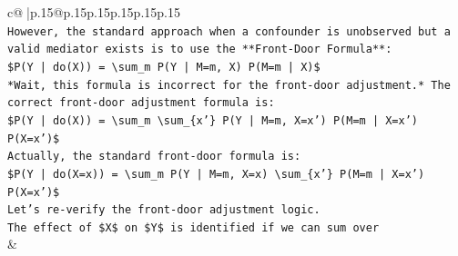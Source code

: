\documentclass{article}
\begin{document}
{\begin{supertabular}{c@{$\;$}|p{.15\linewidth}@{}p{.15\linewidth}p{.15\linewidth}p{.15\linewidth}p{.15\linewidth}p{.15\linewidth}}
{{{\\ 
\texttt{However, the standard approach when a confounder is unobserved but a valid mediator exists is to use the **Front{-}Door Formula**:} \\
\texttt{\$P(Y | do(X)) = \textbackslash{}sum\_m P(Y | M=m, X) P(M=m | X)\$} \\
\texttt{*Wait, this formula is incorrect for the front{-}door adjustment.* The correct front{-}door adjustment formula is:} \\
\texttt{\$P(Y | do(X)) = \textbackslash{}sum\_m \textbackslash{}sum\_\{x'\} P(Y | M=m, X=x') P(M=m | X=x') P(X=x')\$} \\
\texttt{Actually, the standard front{-}door formula is:} \\
\texttt{\$P(Y | do(X=x)) = \textbackslash{}sum\_m P(Y | M=m, X=x) \textbackslash{}sum\_\{x'\} P(M=m | X=x') P(X=x')\$} \\
\texttt{Let's re{-}verify the front{-}door adjustment logic.} \\
\texttt{The effect of \$X\$ on \$Y\$ is identified if we can sum over} \\
            }
        }
    }
    & \\ \\


\end{supertabular}}
\end{document}
